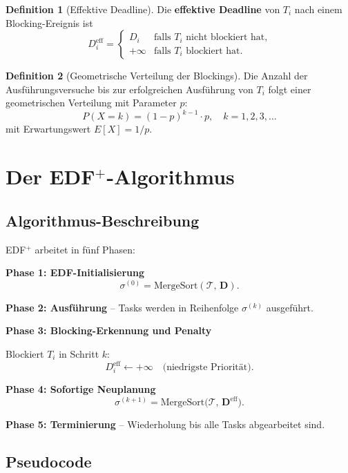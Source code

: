 ﻿\documentclass[a4paper,12pt]{report}
\theoremstyle{definition}
\newtheorem{definition}{Definition}[chapter]
\begin{document}
\begin{definition}[Effektive Deadline]
	Die \textbf{effektive Deadline} von $T_i$ nach einem Blocking-Ereignis ist
	\[
		D_i^{\text{eff}} = \begin{cases}
			D_i      & \text{falls } T_i \text{ nicht blockiert hat,} \\
			+\infty  & \text{falls } T_i \text{ blockiert hat.}
		\end{cases}
	\]
\end{definition}

\begin{definition}[Geometrische Verteilung der Blockings]
	Die Anzahl der Ausführungsversuche bis zur erfolgreichen Ausführung von $T_i$
	folgt einer geometrischen Verteilung mit Parameter $p$:
	\[
		P(X = k) = (1-p)^{k-1} \cdot p, \quad k = 1, 2, 3, \ldots
	\]
	mit Erwartungswert $E[X] = 1/p$.
\end{definition}

\section{Der EDF$^+$-Algorithmus}

\subsection{Algorithmus-Beschreibung}

EDF$^+$ arbeitet in fünf Phasen:

\textbf{Phase 1: EDF-Initialisierung}
\[
	\sigma^{(0)} = \mathrm{MergeSort}(\mathcal{T},\, \mathbf{D}).
\]

\textbf{Phase 2: Ausführung} -- Tasks werden in Reihenfolge $\sigma^{(k)}$ ausgeführt.

\textbf{Phase 3: Blocking-Erkennung und Penalty}

Blockiert $T_i$ in Schritt $k$:
\[
	D_i^{\text{eff}} \leftarrow +\infty \quad \text{(niedrigste Priorität)}.
\]

\textbf{Phase 4: Sofortige Neuplanung}
\[
	\sigma^{(k+1)} = \mathrm{MergeSort}\!\bigl(\mathcal{T},\, \mathbf{D}^{\text{eff}}\bigr).
\]

\textbf{Phase 5: Terminierung} -- Wiederholung bis alle Tasks abgearbeitet sind.

\subsection{Pseudocode}
\end{document}
